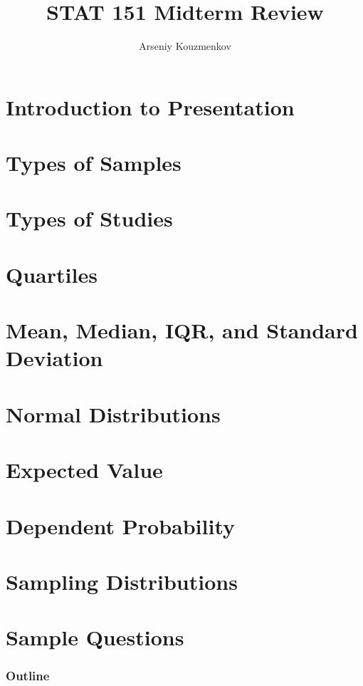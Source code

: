 \documentclass{beamer}
\title{STAT 151 Midterm Review}
\author{Arseniy Kouzmenkov}
\institute{University of Alberta}
\begin{document}
    \begin{frame}
        \titlepage
    \end{frame}

    \section{Introduction to Presentation}
    \section{Types of Samples}
    \section{Types of Studies}
    \section{Quartiles}
    \section{Mean, Median, IQR, and Standard Deviation}
    \section{Normal Distributions}
    \section{Expected Value}
    \section{Dependent Probability}
    \section{Sampling Distributions}
    \section{Sample Questions}

    \begin{frame}
        \frametitle{Outline}
        \tableofcontents
    \end{frame}
\end{document}
